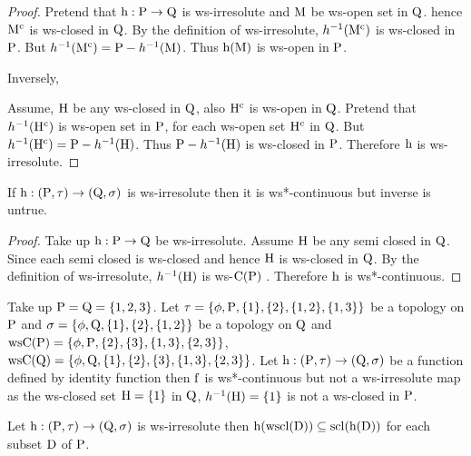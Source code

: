 \begin{proof}
Pretend that $\mathrm{h}: \mathrm{P}\to \mathrm{Q}$ is ws-irresolute and $\mathrm{M}$ be ws-open set in $\mathrm{Q}$. hence $\mathrm{M}^{\text{c}}$ is ws-closed in $\mathrm{Q}$. By the definition of ws-irresolute, $h^{-1}(\mathrm{M}^{\text{c}})$ is ws-closed in $\mathrm{P}$. But $h^{-1} (\mathrm{M}^{\text{c}})= \mathrm{P} -h^{-1}(\mathrm{M})$. Thus $\mathrm{h} (\mathrm{M})$ is ws-open in $\mathrm{P}$.

Inversely,

Assume, $\mathrm{H}$ be any ws-closed in $\mathrm{Q}$, also $\mathrm{H}^{\text{c}}$ is ws-open in $\mathrm{Q}$. Pretend that $h^{-1}(\mathrm{H}^{\text{c}})$ is ws-open set in $\mathrm{P}$, for each ws-open set $\mathrm{H}^{\text{c}}$ in $\mathrm{Q}$. But $h^{-1}(\mathrm{H}^{\text{c}})=\mathrm{P}-h^{-1}(\mathrm{H})$. Thus $\mathrm{P}-h^{-1}(\mathrm{H})$ is ws-closed in $\mathrm{P}$. Therefore $\mathrm{h}$ is ws-irresolute.
\end{proof}

\begin{thm}\label{thm3.3.3}
If $\mathrm{h}: (\mathrm{P},\tau ) \to (\mathrm{Q}, \sigma)$ is ws-irresolute then it is ws*-continuous but inverse is untrue.
\end{thm}

\begin{proof}
Take up $\mathrm{h}: \mathrm{P}\to \mathrm{Q}$ be ws-irresolute. Assume $\mathrm{H}$ be any semi closed in $\mathrm{Q}$. Since each semi closed is ws-closed and hence $\mathrm{H}$ is ws-closed in $\mathrm{Q}$. By the definition of ws-irresolute, $h^{-1}(\mathrm{H})$ is ws-$\mathrm{C}(\mathrm{P})$ . Therefore $\mathrm{h}$ is ws*-continuous.
\end{proof}

\begin{exm}\label{exam3.3.2}
Take up $\mathrm{P}=\mathrm{Q}= \{1, 2, 3\}$. Let $\tau =\{\phi, \mathrm{P}, \{1\}, \{2\}, \{1, 2\}, \{1, 3\}\}$ be a topology on $\mathrm{P}$ and $\sigma =\{\phi, \mathrm{Q}, \{1\}, \{2\}, \{1, 2\}\}$ be a topology on $\mathrm{Q}$ and $\mathrm{ws}\mathrm{C}(\mathrm{P})= \{\phi, \mathrm{P}, \{2\},\{3\}, \{1, 3\},\{2, 3\}\}$, $\mathrm{ws}\mathrm{C}(\mathrm{Q})= \{\phi, \mathrm{Q}, \{1\}, \{2\},\{3\}, \{1, 3\},\{2, 3\}\}$. Let $\mathrm{h}: (\mathrm{P}, \tau )\to (\mathrm{Q}, \sigma)$ be a function defined by identity function then $\mathrm{f}$ is ws*-continuous but not a ws-irresolute map as the ws-closed set $\mathrm{H}=\{1\}$ in $\mathrm{Q}$, $h^{-1}(\mathrm{H})=\{1\}$ is not a ws-closed in $\mathrm{P}$.
\end{exm}

\begin{thm}\label{thm3.3.4}
Let $\mathrm{h}: (\mathrm{P},\tau )\to (\mathrm{Q}, \sigma)$ is ws-irresolute then $\mathrm{h}(\mathrm{wscl}(\mathrm{D})) \subseteq \mathrm{scl}(\mathrm{h}(\mathrm{D}))$ for each subset $\mathrm{D}$ of $\mathrm{P}$.
\end{thm}


